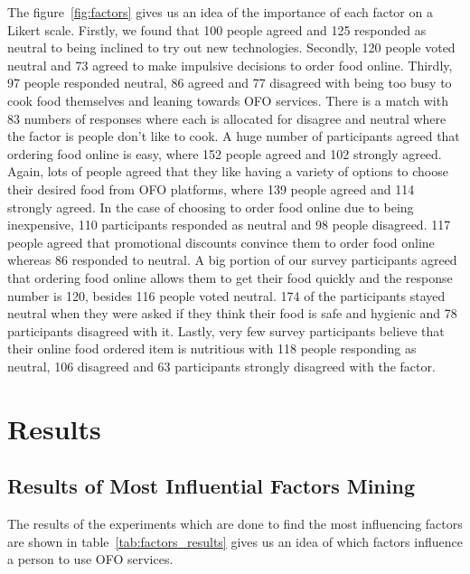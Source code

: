 \documentclass[a4paper,fleqn]{cas-sc}
\begin{document}
The figure~\ref{fig:factors} gives us an idea of the importance of each factor on a Likert scale. Firstly, we found that 100 people agreed and 125 responded as neutral to being inclined to try out new technologies. Secondly, 120 people voted neutral and 73 agreed to make impulsive decisions to order food online. Thirdly, 97 people responded neutral, 86 agreed and 77 disagreed with being too busy to cook food themselves and leaning towards OFO services. There is a match with 83 numbers of responses where each is allocated for disagree and neutral where the factor is people don't like to cook. A huge number of participants agreed that ordering food online is easy, where 152 people agreed and 102 strongly agreed. Again, lots of people agreed that they like having a variety of options to choose their desired food from OFO platforms, where 139 people agreed and 114 strongly agreed. In the case of choosing to order food online due to being inexpensive, 110 participants responded as neutral and 98 people disagreed. 117 people agreed that promotional discounts convince them to order food online whereas 86 responded to neutral. A big portion of our survey participants agreed that ordering food online allows them to get their food quickly and the response number is 120, besides 116 people voted neutral. 174 of the participants stayed neutral when they were asked if they think their food is safe and hygienic and 78 participants disagreed with it. Lastly, very few survey participants believe that their online food ordered item is nutritious with 118 people responding as neutral, 106 disagreed and 63 participants strongly disagreed with the factor.

\section{Results}

\subsection{Results of Most Influential Factors Mining}
The results of the experiments which are done to find the most influencing factors are shown in table~\ref{tab:factors_results} gives us an idea of which factors influence a person to use OFO services. 
\end{document}
